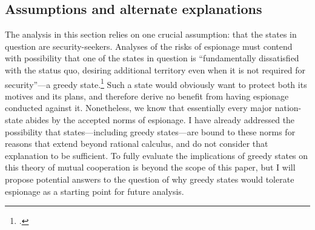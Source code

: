 \documentclass[12pt]{extarticle}
\begin{document}

\subsection{Assumptions and alternate explanations}
The analysis in this section relies on one crucial assumption: that the states in question are security-seekers. Analyses of the risks of espionage must contend with possibility that one of the states in question is \enquote{fundamentally dissatisfied with the status quo, desiring additional territory even when it is not required for security}---a greedy state.\footcite[4]{glaser_rational_2010} Such a state would obviously want to protect both its motives and its plans, and therefore derive no benefit from having espionage conducted against it. Nonetheless, we know that essentially every major nation-state abides by the accepted norms of espionage. I have already addressed the possibility that states---including greedy states---are bound to these norms for reasons that extend beyond rational calculus, and do not consider that explanation to be sufficient. To fully evaluate the implications of greedy states on this theory of mutual cooperation is beyond the scope of this paper, but I will propose potential answers to the question of why greedy states would tolerate espionage as a starting point for future analysis.
\end{document}
